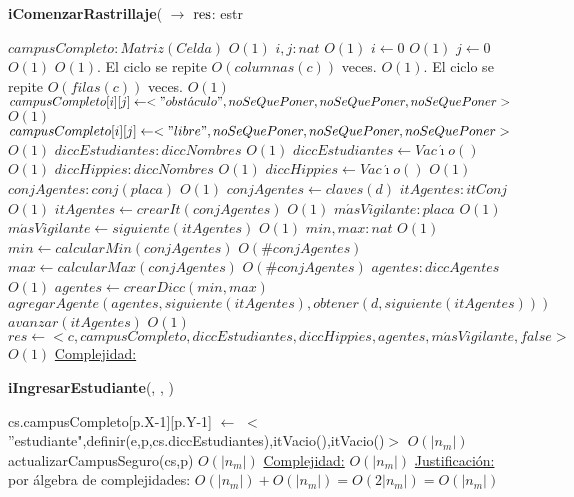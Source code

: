 \begin{Algoritmos}
\begin{algorithm}[H]{\textbf{iComenzarRastrillaje}( $\to$ $\res$: estr}
  \begin{algorithmic}
	\State $campusCompleto: Matriz(Celda)$	\Comment $O(1)$
    \State $i,j: nat$	\Comment $O(1)$
    \State $i \gets 0$	\Comment $O(1)$
    \State $j \gets 0$	\Comment $O(1)$
    	\Comment $O(1)$. El ciclo se repite $O(columnas(c))$ veces.
    		\Comment $O(1)$. El ciclo se repite $O(filas(c))$ veces.
        		\Comment $O(1)$
            	\State $campusCompleto[i][j] \gets <"obst\acute{a}culo",noSeQuePoner,noSeQuePoner,noSeQuePoner>$	\Comment $O(1)$
            \Else
            	\State $campusCompleto[i][j] \gets <"libre",noSeQuePoner,noSeQuePoner,noSeQuePoner>$	\Comment $O(1)$
            \EndIf
        \EndWhile \Comment
    \EndWhile \Comment 
    \State $diccEstudiantes: diccNombres$	\Comment $O(1)$
    \State $diccEstudiantes \gets Vac\acute{\imath}o()$	\Comment $O(1)$
	\State $diccHippies: diccNombres$	\Comment $O(1)$
    \State $diccHippies \gets Vac\acute{\imath}o()$	\Comment $O(1)$
    \State $conjAgentes: conj(placa)$	\Comment $O(1)$
    \State $conjAgentes \gets claves(d)$
    \State $itAgentes: itConj$	\Comment $O(1)$
    \State $itAgentes \gets crearIt(conjAgentes)$	\Comment $O(1)$
    \State $m\acute{a}sVigilante: placa$	\Comment $O(1)$
    \State $m\acute{a}sVigilante \gets siguiente(itAgentes)$	\Comment $O(1)$
    \State $min, max: nat$	\Comment $O(1)$
    \State $min \gets calcularMin(conjAgentes)$	\Comment $O(\#conjAgentes)$
    \State $max \gets calcularMax(conjAgentes)$	\Comment $O(\#conjAgentes)$
    \State $agentes: diccAgentes$	\Comment $O(1)$
    \State $agentes \gets crearDicc(min,max)$
    	\State $agregarAgente(agentes,siguiente(itAgentes),obtener(d,siguiente(itAgentes)))$
        \State $avanzar(itAgentes)$	\Comment $O(1)$
    \EndWhile
    \State $res \gets <c,campusCompleto,diccEstudiantes,diccHippies,agentes,m\acute{a}sVigilante,false>$	\Comment $O(1)$
    \medskip
	\Statex \underline{Complejidad:}
  \end{algorithmic}
\end{algorithm}

\begin{algorithm}[H]{\textbf{iIngresarEstudiante}(, , )}
	\begin{algorithmic}
    	\State cs.campusCompleto[p.X-1][p.Y-1] $\gets$ $<$''estudiante",definir(e,p,cs.diccEstudiantes),itVacio(),itVacio()$>$	\Comment $O(|n_{m}|)$
		\State actualizarCampusSeguro(cs,p)	\Comment $O(|n_{m}|)$
        \medskip
		\Statex \underline{Complejidad:} $O(|n_{m}|)$
        \Statex \underline{Justificaci\'on:} por \'algebra de complejidades: $O(|n_{m}|) + O(|n_{m}|) = O(2|n_{m}|) = O(|n_{m}|)$
	\end{algorithmic}
\end{algorithm}


\end{Algoritmos}
